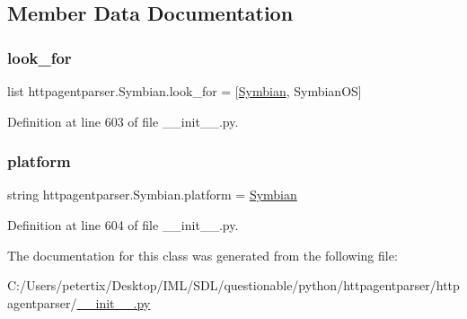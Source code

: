 \subsection{Member Data Documentation}
\hypertarget{classhttpagentparser_1_1_symbian_af26c3a7969c18ae9a901b49fa610cd94}{}\label{classhttpagentparser_1_1_symbian_af26c3a7969c18ae9a901b49fa610cd94} 
\subsubsection{\texorpdfstring{look\+\_\+for}{look\_for}}
{\footnotesize\ttfamily list httpagentparser.\+Symbian.\+look\+\_\+for = \mbox{[}\textquotesingle{}\hyperlink{classhttpagentparser_1_1_symbian}{Symbian}\textquotesingle{}, \textquotesingle{}Symbian\+OS\textquotesingle{}\mbox{]}\hspace{0.3cm}{\ttfamily [static]}}



Definition at line 603 of file \+\_\+\+\_\+init\+\_\+\+\_\+.\+py.

\hypertarget{classhttpagentparser_1_1_symbian_a38bd2ff1d0b9e6ddc55a20cb9e8a2f5b}{}\label{classhttpagentparser_1_1_symbian_a38bd2ff1d0b9e6ddc55a20cb9e8a2f5b} 
\subsubsection{\texorpdfstring{platform}{platform}}
{\footnotesize\ttfamily string httpagentparser.\+Symbian.\+platform = \textquotesingle{}\hyperlink{classhttpagentparser_1_1_symbian}{Symbian}\textquotesingle{}\hspace{0.3cm}{\ttfamily [static]}}



Definition at line 604 of file \+\_\+\+\_\+init\+\_\+\+\_\+.\+py.



The documentation for this class was generated from the following file\+:\begin{DoxyCompactItemize}
\item 
C\+:/\+Users/petertix/\+Desktop/\+I\+M\+L/\+S\+D\+L/questionable/python/httpagentparser/httpagentparser/\hyperlink{____init_____8py}{\+\_\+\+\_\+init\+\_\+\+\_\+.\+py}\end{DoxyCompactItemize}
